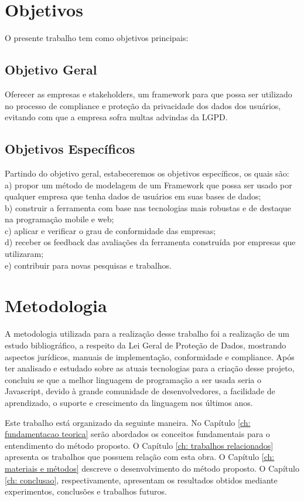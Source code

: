 \documentclass[
	12pt,				%
	openright,			%
	oneside,			%
	a4paper,			%
	english,			%
	french,				%
	spanish,			%
	brazil,				%
	]{abntex2}
\begin{document}
\section{Objetivos}
\label{sec: Objetivos}
O presente trabalho tem como objetivos principais: 
\subsection{Objetivo Geral}
Oferecer as empresas e stakeholders, um framework para que possa ser utilizado no processo de compliance e proteção da privacidade dos dados dos usuários, evitando com que a empresa sofra multas advindas da LGPD.

\subsection{Objetivos Específicos}
Partindo do objetivo geral, estabeceremos os objetivos específicos, os quais são: 
\\  a)	propor um método de modelagem de um Framework que possa ser usado por qualquer empresa que tenha dados de usuários em suas bases de dados;
\\ b)	construir a ferramenta com base nas tecnologias mais robustas e de destaque na programação mobile e web;
\\ c)	aplicar e verificar o grau de conformidade das empresas;
\\ d)	receber os feedback das avaliações da ferramenta construída por empresas que utilizaram;
\\ e)	contribuir para novas pesquisas e trabalhos. 
\section{Metodologia}
\label{sec: Metodologia}
A metodologia utilizada para a realização desse trabalho foi a realização de um estudo bibliográfico, a respeito da Lei Geral de Proteção de Dados, mostrando aspectos jurídicos, manuais de implementação, conformidade e compliance. Após ter analisado e estudado sobre as atuais tecnologias para a criação desse projeto, concluiu se que a melhor linguagem de programação a ser usada seria o Javascript, devido à grande comunidade de desenvolvedores, a facilidade de aprendizado, o suporte e crescimento da linguagem nos últimos anos. 


Este trabalho está organizado da seguinte maneira. No Capítulo \ref{ch: fundamentacao teorica} serão abordados os conceitos fundamentais para o entendimento do método proposto. O Capítulo \ref{ch: trabalhos relacionados} apresenta os trabalhos que possuem relação com esta obra. O Capítulo \ref{ch: materiais e métodos} descreve o desenvolvimento do método proposto. O Capítulo  \ref{ch: conclusao}, respectivamente, apresentam os resultados obtidos mediante experimentos, conclusões e trabalhos futuros.
\end{document}
